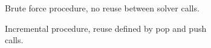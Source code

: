 \begin{figure}[h]
  \begin{subfigure}[t]{.45\textwidth}
    \vskip 0pt
    
    \caption{Brute force procedure, no reuse between solver calls.}%
    \label{fig:bkg:bf}
  \end{subfigure}%
  \begin{subfigure}[t]{.45\textwidth}
    \vskip 0pt
    
    \caption{Incremental procedure, reuse defined by pop and push calls.}%
    \label{fig:bkg:inc}
  \end{subfigure}
  \caption{}%
  \label{fig:bkg}
\end{figure}